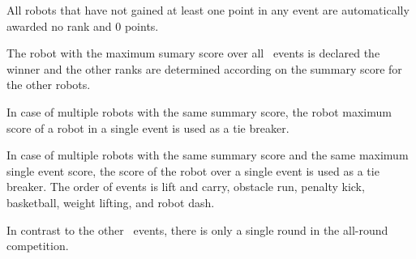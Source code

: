 \documentclass[12pt]{hurocup}
\begin{document}
\begin{lawlist}[ALR]

\item All robots that have not gained at least one point in any event
 are automatically awarded no rank and $0$ points.

\item The robot with the maximum sumary score over all \HuroCup\
 events is declared the winner and the other ranks are determined
 according on the summary score for the other robots.

\item In case of multiple robots with the same summary score, the
 robot maximum score of a robot in a single event is used as a tie
 breaker.

\item In case of multiple robots with the same summary score and the
 same maximum single event score, the score of the robot over a single
 event is used as a tie breaker. The order of events is lift and
 carry, obstacle run, penalty kick, basketball, weight lifting, and
 robot dash.

\item In contrast to the other \HuroCup\ events, there is only a
 single round in the all-round competition. 

\end{lawlist}
\end{document}
